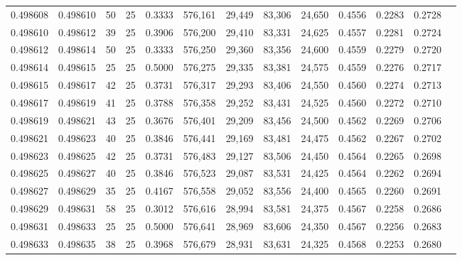 \begin{tabular}{rrrrrrrrrrrrr}
0.498608 & 0.498610 &    50 &  25 &                                     0.3333 & 576,161 &  29,449 &  83,306 &  24,650 & 0.4556 & 0.2283 & 0.2728 \\
0.498610 & 0.498612 &    39 &  25 &                                     0.3906 & 576,200 &  29,410 &  83,331 &  24,625 & 0.4557 & 0.2281 & 0.2724 \\
0.498612 & 0.498614 &    50 &  25 &                                     0.3333 & 576,250 &  29,360 &  83,356 &  24,600 & 0.4559 & 0.2279 & 0.2720 \\
0.498614 & 0.498615 &    25 &  25 &                                     0.5000 & 576,275 &  29,335 &  83,381 &  24,575 & 0.4559 & 0.2276 & 0.2717 \\
0.498615 & 0.498617 &    42 &  25 &                                     0.3731 & 576,317 &  29,293 &  83,406 &  24,550 & 0.4560 & 0.2274 & 0.2713 \\
0.498617 & 0.498619 &    41 &  25 &                                     0.3788 & 576,358 &  29,252 &  83,431 &  24,525 & 0.4560 & 0.2272 & 0.2710 \\
0.498619 & 0.498621 &    43 &  25 &                                     0.3676 & 576,401 &  29,209 &  83,456 &  24,500 & 0.4562 & 0.2269 & 0.2706 \\
0.498621 & 0.498623 &    40 &  25 &                                     0.3846 & 576,441 &  29,169 &  83,481 &  24,475 & 0.4562 & 0.2267 & 0.2702 \\
0.498623 & 0.498625 &    42 &  25 &                                     0.3731 & 576,483 &  29,127 &  83,506 &  24,450 & 0.4564 & 0.2265 & 0.2698 \\
0.498625 & 0.498627 &    40 &  25 &                                     0.3846 & 576,523 &  29,087 &  83,531 &  24,425 & 0.4564 & 0.2262 & 0.2694 \\
0.498627 & 0.498629 &    35 &  25 &                                     0.4167 & 576,558 &  29,052 &  83,556 &  24,400 & 0.4565 & 0.2260 & 0.2691 \\
0.498629 & 0.498631 &    58 &  25 &                                     0.3012 & 576,616 &  28,994 &  83,581 &  24,375 & 0.4567 & 0.2258 & 0.2686 \\
0.498631 & 0.498633 &    25 &  25 &                                     0.5000 & 576,641 &  28,969 &  83,606 &  24,350 & 0.4567 & 0.2256 & 0.2683 \\
0.498633 & 0.498635 &    38 &  25 &                                     0.3968 & 576,679 &  28,931 &  83,631 &  24,325 & 0.4568 & 0.2253 & 0.2680 \\

\end{tabular}
